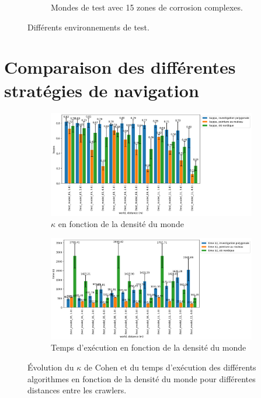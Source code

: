 \documentclass[english,RandD]{rapportPFE}  %
\begin{document}
\begin{figure}[H]
\begin{subfigure}[t]{0.15\linewidth}
				\caption{Mondes de test avec 15 zones de corrosion complexes.}
				\label{fig:test_model_15_complex_1}
			\end{subfigure}
			\caption{Différents environnements de test.}
			\label{fig:test_models}
		\end{figure}
	\section{Comparaison des différentes stratégies de navigation}
		\label{annexe:comparaison}
		\begin{figure}[H]
			\begin{subfigure}[t]{0.9\linewidth}
				\includegraphics[width=\linewidth]{graphics/investigation_polygonale-peinture_au_rouleau_ski_nordique-kappa_for_each_d_vs_investigation_polygonale-kappa_for_each_d.png}
				\caption{$\kappa$ en fonction de la densité du monde}
				\label{fig:investigation_polygonale-peinture_au_rouleau_ski_nordique-kappa_for_each_d_vs_investigation_polygonale-kappa_for_each_d}
			\end{subfigure}
			\hfill
			\begin{subfigure}[t]{0.9\linewidth}
					\includegraphics[width=\linewidth]{graphics/investigation_polygonale-peinture_au_rouleau_ski_nordique-time_for_each_d_vs_investigation_polygonale-time_for_each_d.png}
					\caption{Temps d'exécution en fonction de la densité du monde}
					\label{fig:investigation_polygonale-peinture_au_rouleau_ski_nordique-time_for_each_d_vs_investigation_polygonale-time_for_each_d}
			\end{subfigure}
			\caption{Évolution du $\kappa$ de Cohen et du temps d'exécution des différents algorithmes en fonction de la densité du monde pour différentes distances entre les crawlers.}
			\label{fig:investigation_polygonale-peinture_au_rouleau_ski_nordique_for_each_d}
		\end{figure}
\end{document}
